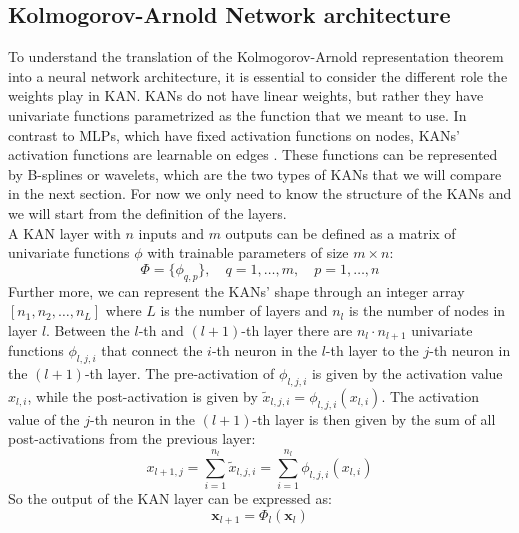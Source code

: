 \documentclass[11pt,a4paper,twocolumn]{article}
\begin{document}
    
    \subsection{Kolmogorov-Arnold Network architecture}
    \label{subsec:KA_architecture}
    To understand the translation of the Kolmogorov-Arnold representation theorem into a neural network architecture, it is essential to consider the different role the weights play in KAN. 
    KANs do not have linear weights, but rather they have univariate functions parametrized as the function that we meant to use.
    In contrast to MLPs, which have fixed activation functions on nodes, KANs' activation functions are learnable on edges \cite{liu2025kankolmogorovarnoldnetworks}.
    These functions can be represented by B-splines or wavelets, which are the two types of KANs that we will compare in the next section.
    For now we only need to know the structure of the KANs and we will start from the definition of the layers.
    \\
    A KAN layer with $n$ inputs and $m$ outputs can be defined as a matrix of univariate functions $\phi$ with trainable parameters of size $m \times n$:
    \begin{equation}
    \label{eq:KAN_layer}
        \Phi =\{\phi_{q,p}\}, \quad q=1,\ldots,m, \quad p=1,\ldots,n
    \end{equation}
    Further more, we can represent the KANs' shape through an integer array $[n_1, n_2, \ldots, n_L]$ where $L$ is the number of layers and $n_l$ is the number of nodes in layer $l$.
    Between the $l$-th and $(l+1)$-th layer there are $n_l \cdot n_{l+1}$ univariate functions $\phi_{l,j,i}$ that connect the $i$-th neuron in the $l$-th layer to the $j$-th neuron in the $(l+1)$-th layer.
    The pre-activation of $\phi_{l,j,i}$ is given by the activation value $x_{l,i}$, while the post-activation is given by $\tilde{x}_{l,j,i}=\phi_{l,j,i}(x_{l,i})$. 
    The activation value of the $j$-th neuron in the $(l+1)$-th layer is then given by the sum of all post-activations from the previous layer:
    \begin{equation}
        \label{eq:KAN_output}
        x_{l+1,j} = \sum_{i=1}^{n_l} \tilde{x}_{l,j,i} = \sum_{i=1}^{n_l} \phi_{l,j,i}(x_{l,i})
    \end{equation}
    So the output of the KAN layer can be expressed as:
    \begin{equation}
        \label{eq:KAN_output_matrix}
        \bm{x}_{l+1} = \Phi_l(\bm{x}_l)
    \end{equation}
\end{document}
